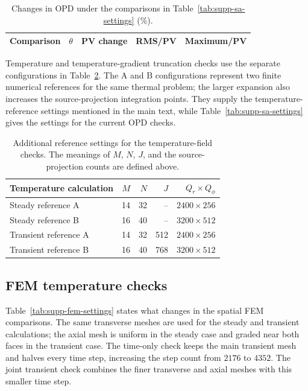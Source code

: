 \documentclass[9pt]{osa-supplemental-document}
\begin{document}
\begin{table}[!htbp]\centering\small
\caption{Changes in OPD under the comparisons in Table~\ref{tab:supp-sa-settings} (\%).}\label{tab:supp-sa-changes}
\begin{tabular}{lrrrr}\toprule
Comparison & $\theta$ & PV change & RMS/PV & Maximum/PV\\\midrule

\end{tabular}
\end{table}
Temperature and temperature-gradient truncation checks use the separate configurations in Table~\ref{tab:supp-temperature-settings}.
The A and B configurations represent two finite numerical references for the same thermal problem; the larger expansion also increases the source-projection integration points.
They supply the temperature-reference settings mentioned in the main text, while Table~\ref{tab:supp-sa-settings} gives the settings for the current OPD checks.

\begin{table}[!htbp]\centering\small
\caption{Additional reference settings for the temperature-field checks. The meanings of $M$, $N$, $J$, and the source-projection counts are defined above.}\label{tab:supp-temperature-settings}
\begin{tabular}{lrrrr}\toprule
Temperature calculation & $M$ & $N$ & $J$ & $Q_r\times Q_\phi$\\\midrule
Steady reference A & 14 & 32 & -- & $2400\times256$\\
Steady reference B & 16 & 40 & -- & $3200\times512$\\
Transient reference A & 14 & 32 & 512 & $2400\times256$\\
Transient reference B & 16 & 40 & 768 & $3200\times512$\\\bottomrule
\end{tabular}
\end{table}

\FloatBarrier

\subsection*{FEM temperature checks}
Table~\ref{tab:supp-fem-settings} states what changes in the spatial FEM comparisons.
The same transverse meshes are used for the steady and transient calculations; the axial mesh is uniform in the steady case and graded near both faces in the transient case.
The time-only check keeps the main transient mesh and halves every time step, increasing the step count from $2176$ to $4352$.
The joint transient check combines the finer transverse and axial meshes with this smaller time step.
\end{document}
